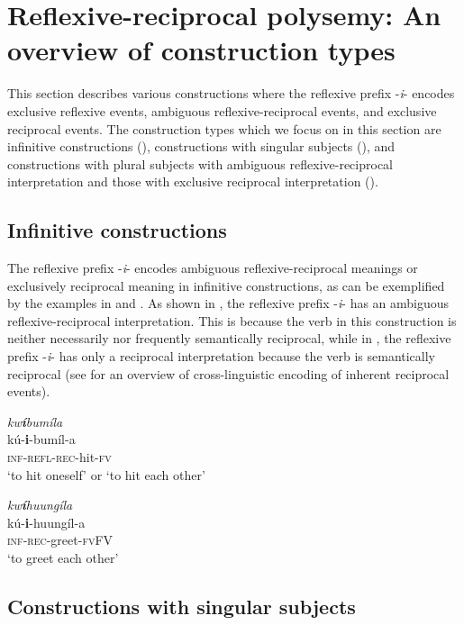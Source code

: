 \documentclass[output=paper,
            colorlinks, citecolor=brown
            ,draftmode
		  ]{langscibook}
\begin{document}
\section{Reflexive-reciprocal polysemy: An overview of construction types}\label{sec:ngwasi:2}

This section describes various constructions where the reflexive prefix -\textit{i}{}- encodes exclusive reflexive events, ambiguous reflexive-reciprocal events, and exclusive reciprocal events. The construction types which we focus on in this section are infinitive constructions (), constructions with singular subjects (), and constructions with plural subjects with ambiguous reflexive-reciprocal interpretation and those with exclusive reciprocal interpretation ().

\subsection{Infinitive constructions}\label{sec:ngwasi:2.1}

The reflexive prefix -\textit{i}{}- encodes ambiguous reflexive-reciprocal meanings or exclusively reciprocal meaning in infinitive constructions, as can be exemplified by the examples in  and . As shown in , the reflexive prefix -\textit{i}{}- has an ambiguous reflexive-reciprocal interpretation. This is because the verb in this construction is neither necessarily nor frequently semantically reciprocal, while in , the reflexive prefix -\textit{i}{}- has only a reciprocal interpretation because the verb is semantically reciprocal (see \citealt{Nedjalkov2007} for an overview of cross-linguistic encoding of inherent reciprocal events).

\ea\label{ex:ngwasi:8}
\glll \textit{kw}\textbf{\textit{í}}\textit{bumíla}\\
kú-\textbf{i}{}-bumíl-a\\
\textsc{inf-refl-rec}-hit-\textsc{fv}\\
\glt ‘to hit oneself’ or ‘to hit each other’

\ex\label{ex:ngwasi:9} 
\glll \textit{kw}\textbf{\textit{í}}\textit{huungíla}\\
kú-\textbf{i}{}-huungíl-a\\
\textsc{inf-rec}-greet-\textsc{fv}FV\\
\glt ‘to greet each other’
\z

\subsection{Constructions with singular subjects}\label{sec:ngwasi:2.2}
\end{document}
